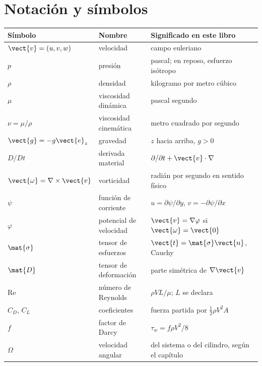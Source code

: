 \chapter{Notación y símbolos}
\label{ch:notacion}

\begin{longtable}{@{}p{}p{}p{}@{}}
\toprule
\textbf{Símbolo} & \textbf{Nombre} & \textbf{Significado en este libro}\\
\midrule
\endhead
\(\vect{v}=(u,v,w)\) & velocidad & campo euleriano \\
\(p\) & presión & pascal; en reposo, esfuerzo isótropo \\
\(\rho\) & densidad & kilogramo por metro cúbico \\
\(\mu\) & viscosidad dinámica & pascal segundo \\
\(\nu=\mu/\rho\) & viscosidad cinemática & metro cuadrado por segundo \\
\(\vect{g}=-g\vect{e}_z\) & gravedad & \(z\) hacia arriba, \(g>0\) \\
\(D/Dt\) & derivada material & \(\partial/\partial t+\vect{v}\cdot\nabla\) \\
\(\vect{\omega}=\nabla\times\vect{v}\) & vorticidad & radián por segundo en sentido físico \\
\(\psi\) & función de corriente & \(u=\partial\psi/\partial y\), \(v=-\partial\psi/\partial x\) \\
\(\varphi\) & potencial de velocidad & \(\vect{v}=\nabla\varphi\) si \(\vect{\omega}=\vect{0}\) \\
\(\mat{\sigma}\) & tensor de esfuerzos & \(\vect{t}=\mat{\sigma}\vect{n}\), Cauchy \\
\(\mat{D}\) & tensor de deformación & parte simétrica de \(\nabla\vect{v}\) \\
\(\mathrm{Re}\) & número de Reynolds & \(\rho V L/\mu\); \(L\) se declara \\
\(C_D\), \(C_L\) & coeficientes & fuerza partida por \(\tfrac12\rho V^2 A\) \\
\(f\) & factor de Darcy & \(\tau_w=f\rho V^2/8\) \\
\(\Omega\) & velocidad angular & del sistema o del cilindro, según el capítulo \\
\bottomrule
\end{longtable}
